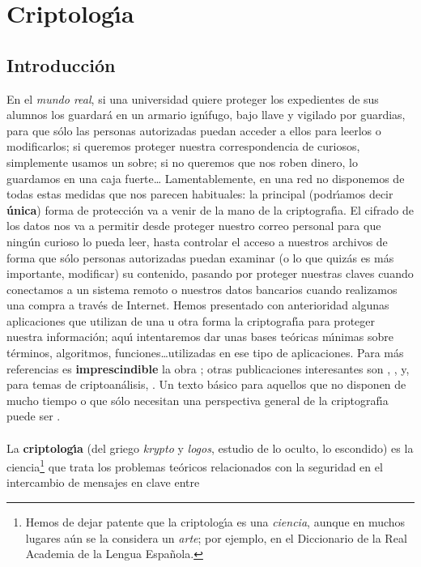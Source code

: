 \chapter{Criptolog\'{\i}a}
\section{Introducci\'on}
En el {\it mundo real}, si una universidad quiere proteger los 
expedientes de sus alumnos los guardar\'a en un armario ign\'{\i}fugo, bajo
llave y vigilado por guardias, para que s\'olo las personas autorizadas 
puedan acceder a ellos para leerlos o modificarlos; si queremos 
proteger nuestra correspondencia de curiosos, simplemente usamos un sobre; si 
no queremos que nos roben dinero, lo guardamos en una caja fuerte\ldots 
Lamentablemente, en una red no disponemos de todas estas medidas que nos 
parecen habituales: la principal (podr\'{\i}amos decir {\bf \'unica}) forma de 
protecci\'on 
va a venir de la mano de la criptograf\'{\i}a. El cifrado de los datos nos va a
permitir desde proteger nuestro correo personal para que ning\'un curioso lo 
pueda leer, hasta controlar el acceso a nuestros archivos de forma que s\'olo 
personas autorizadas puedan examinar (o lo que quiz\'as es m\'as importante, 
mo\-di\-fi\-car) su contenido, pasando por proteger nuestras claves cuando
conectamos a un sistema remoto o nuestros datos bancarios cuando realizamos
una compra a trav\'es de Internet. Hemos presentado con anterioridad algunas
aplicaciones que utilizan de una u otra forma la criptograf\'{\i}a para proteger
nuestra informaci\'on; aqu\'{\i} intentaremos dar unas bases te\'oricas 
m\'{\i}nimas sobre t\'erminos, algoritmos, funciones\ldots utilizadas en ese
tipo de aplicaciones. Para m\'as referencias es {\bf imprescindible} la obra 
\cite{kn:sch94}; otras publicaciones interesantes son \cite{kn:men96}, 
\cite{kn:den83}, \cite{kn:sal90} y, para temas de criptoan\'alisis,
\cite{kn:army}. Un texto b\'asico para aquellos que no 
disponen de mucho tiempo o que s\'olo necesitan una perspectiva general de la
criptograf\'{\i}a puede ser \cite{kn:cab96}.\\
\\La {\bf criptolog\'{\i}a} (del griego {\it krypto} y {\it logos}, estudio 
de lo oculto, lo escondido) es la ciencia\footnote{Hemos de dejar patente 
que la criptolog\'{\i}a es una {\it ciencia}, aunque en muchos lugares a\'un 
se la considera un {\it arte}; por ejemplo, en el Diccionario de la Real 
Academia de la Lengua Espa\~nola.} que trata los problemas te\'oricos
relacionados con la seguridad en el intercambio de mensajes en clave entre
